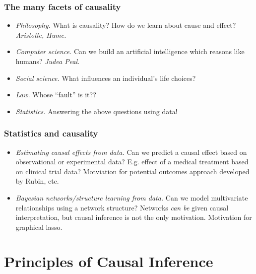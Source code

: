 \documentclass{beamer}
\begin{document}
\begin{frame}
\frametitle{The many facets of causality}
\begin{itemize}
\item \emph{Philosophy.} What is causality?  How do we learn about cause and effect? \emph{Aristotle, Hume.}
\item \emph{Computer science.}  Can we build an artificial intelligence which reasons like humans? \emph{Judea Peal.}
\item \emph{Social science.}  What influences an individual's life choices? 
\item \emph{Law.} Whose ``fault'' is it??
\item \emph{Statistics.} Answering the above questions using data!
\end{itemize}
\end{frame}

\begin{frame}
\frametitle{Statistics and causality}
\begin{itemize}
\item \emph{Estimating causal effects from data.} Can we predict a causal effect based on observational or experimental data? 
E.g. effect of a medical treatment based on clinical trial data?
Motviation for potential outcomes approach developed by Rubin, etc.
\item \emph{Bayesian networks/structure learning from data.} Can we model multivariate relationships using a network structure?
Networks \emph{can be} given causal interpretation, but causal inference is not the only motivation.
Motivation for graphical lasso.
\end{itemize}
\end{frame}

\section{Principles of Causal Inference}
\sectionpage
\end{document}
